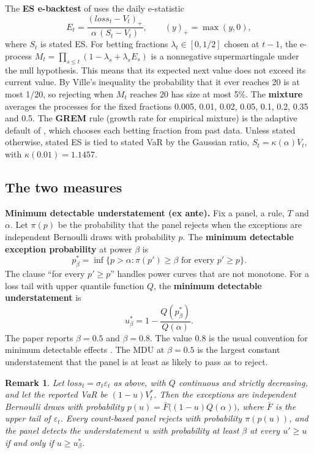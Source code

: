 \documentclass[11pt]{article}
\newtheorem{remark}{Remark}
\begin{document}
The \textbf{ES e-backtest} of \citet{wang2025} uses the daily e-statistic
\[
E_t = \frac{(\mathit{loss}_t - V_t)_+}{\alpha\,(S_t - V_t)}, \qquad (y)_+ = \max(y,0),
\]
where $S_t$ is stated ES. For betting fractions $\lambda_t \in [0,1/2]$ chosen
at $t-1$, the e-process $M_t = \prod_{s \le t}(1 - \lambda_s + \lambda_s E_s)$
is a nonnegative supermartingale under the null hypothesis. This means that
its expected next value does not exceed its current value. By
Ville's inequality the probability that it ever reaches 20 is at most 1/20, so
rejecting when $M_t$ reaches 20 has size at most 5\%. The
\textbf{mixture} averages the processes for the fixed fractions 0.005, 0.01,
0.02, 0.05, 0.1, 0.2, 0.35 and 0.5. The \textbf{GREM} rule (growth rate for
empirical mixture) is the adaptive default of \citet{wang2025}, which chooses each betting
fraction from past data. Unless stated otherwise, stated ES is tied to stated
VaR by the Gaussian ratio, $S_t = \kappa(\alpha) V_t$, with $\kappa(0.01) = 1.1457$.

\subsection{The two measures}

\textbf{Minimum detectable understatement (ex ante).} Fix a panel, a rule, $T$
and $\alpha$. Let $\pi(p)$ be the probability that the panel rejects when the
exceptions are independent Bernoulli draws with probability $p$. The
\textbf{minimum detectable exception probability} at power $\beta$ is
\[
p^*_\beta = \inf\{p > \alpha : \pi(p') \ge \beta \text{ for every } p' \ge p\}.
\]
The clause ``for every $p' \ge p$'' handles power curves that are not
monotone. For a loss tail with upper quantile function $Q$, the
\textbf{minimum detectable understatement} is
\[
u^*_\beta = 1 - \frac{Q(p^*_\beta)}{Q(\alpha)}.
\]
The paper reports $\beta = 0.5$ and $\beta = 0.8$. The value 0.8 is the usual
convention for minimum detectable effects \citep{bloom1995}. The MDU at
$\beta = 0.5$ is the largest constant understatement that the panel is at least
as likely to pass as to reject.

\begin{remark}
\label{prop:sep}
Let $\mathit{loss}_t = \sigma_t \varepsilon_t$ as above, with $Q$ continuous and
strictly decreasing, and let the reported VaR be $(1-u)V^*_t$. Then the
exceptions are independent Bernoulli draws with probability $p(u) =
\bar{F}\bigl((1-u)Q(\alpha)\bigr)$, where $\bar{F}$ is the upper tail of
$\varepsilon_t$. Every count-based panel rejects with probability
$\pi(p(u))$, and the panel detects the understatement $u$ with probability at
least $\beta$ at every $u' \ge u$ if and only if $u \ge u^*_\beta$.
\end{remark}
\end{document}
